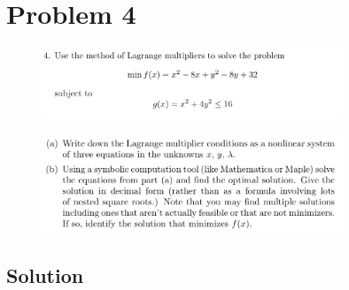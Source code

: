 
\begingroup
\allowdisplaybreaks

\newpage
\section*{Problem 4}

\begin{figure}[h]
	\centering
	\includegraphics[width=0.8\textwidth]{./images/prob4_statement_1.png}
\end{figure}
\begin{figure}[h]
	\centering
	\includegraphics[width=0.8\textwidth]{./images/prob4_statement_2.png}
\end{figure}

\subsection*{Solution}

